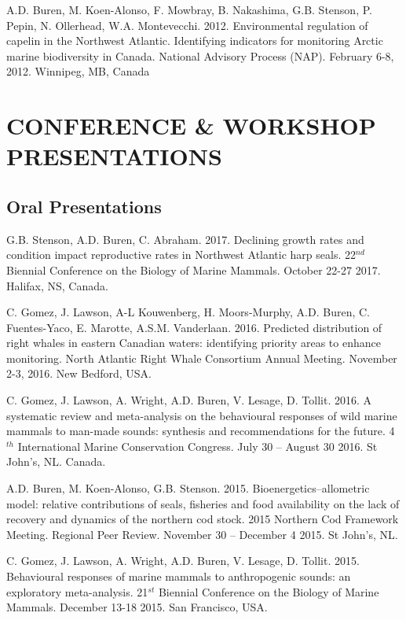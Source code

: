 \documentclass{res}
\begin{document}
\begin{resume}
\begin{hangparas}{.4in}{1}
	A.D. Buren, M. Koen-Alonso, F. Mowbray, B. Nakashima, G.B. Stenson, P. Pepin, N. Ollerhead, W.A. Montevecchi. 2012. Environmental regulation of capelin in the Northwest Atlantic. Identifying indicators for monitoring Arctic marine biodiversity in Canada. National Advisory Process (NAP). February 6-8, 2012. Winnipeg, MB, Canada
\end{hangparas}	

\pagebreak

\section{CONFERENCE \& WORKSHOP PRESENTATIONS}
\subsection{Oral Presentations}
\begin{hangparas}{.4in}{1}
G.B. Stenson, A.D. Buren, C. Abraham. 2017. Declining growth rates and condition impact reproductive rates in Northwest Atlantic harp seals. 22$^{nd}$ Biennial Conference on the Biology of Marine Mammals. October 22-27 2017. Halifax, NS, Canada.

C. Gomez,  J. Lawson, A-L Kouwenberg, H. Moors-Murphy, A.D. Buren, C. Fuentes-Yaco, E.  Marotte, A.S.M. Vanderlaan. 2016. Predicted distribution of right whales in eastern Canadian waters: identifying priority areas to enhance monitoring. North Atlantic Right Whale Consortium Annual Meeting. November 2-3, 2016. New Bedford, USA.

C. Gomez, J. Lawson, A. Wright, A.D. Buren, V. Lesage, D. Tollit. 2016. A systematic review and meta-analysis on the behavioural responses of wild marine mammals to man-made sounds: synthesis and recommendations for the future. 4$^{th}$ International Marine Conservation Congress. July 30 – August 30 2016. St John's, NL. Canada.

A.D. Buren, M. Koen-Alonso, G.B. Stenson. 2015. Bioenergetics–allometric model: relative contributions of seals, fisheries and food availability on the lack of recovery and dynamics of the northern cod stock. 2015 Northern Cod Framework Meeting. Regional Peer Review. November 30 – December 4 2015. St John's, NL.

C. Gomez, J. Lawson, A. Wright, A.D. Buren, V. Lesage, D. Tollit. 2015. Behavioural responses of marine mammals to anthropogenic sounds: an exploratory meta-analysis. 21$^{st}$ Biennial Conference on the Biology of Marine Mammals. December 13-18 2015. San Francisco, USA.


\end{hangparas}
\end{resume}
\end{document}
